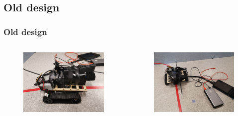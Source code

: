 \subsection{Old design}
\begin{frame}
    \frametitle{Old design}
    \begin{columns}
        \begin{column}[]{0.5\textwidth}
            \begin{figure}
                \centering
                \includegraphics[width=\textwidth]{frames/img/cables.jpg}
            \end{figure}
            
        \end{column}
        \begin{column}[]{0.5\textwidth}
            \begin{figure}
                \centering
                \includegraphics[width=\textwidth]{frames/img/robot.jpg}
            \end{figure}
        \end{column}
    \end{columns}
\end{frame}

